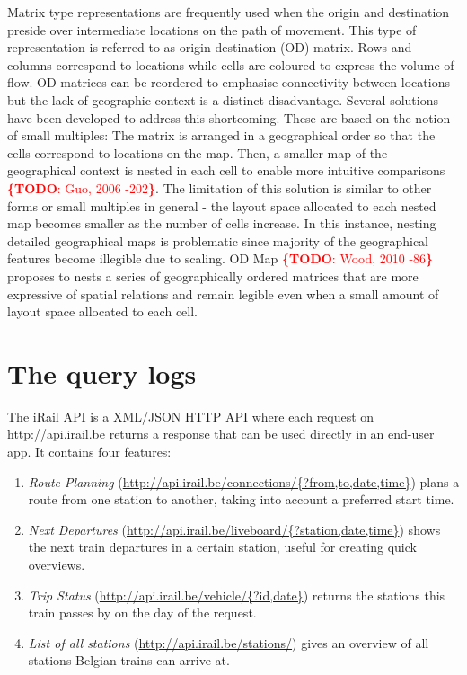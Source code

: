 \documentclass{sig-alternate}
\newcommand{\todo}[1]{\noindent\textcolor{red}{{\bf \{TODO}: #1{\bf \}}}}
\begin{document}
Matrix type representations are frequently used when the origin and destination preside over intermediate locations on the path of movement. This type of representation is referred to as origin-destination (OD) matrix. Rows and columns correspond to locations while cells are coloured to express the volume of flow. OD matrices can be reordered to emphasise connectivity between locations but the lack of geographic context is a distinct disadvantage. Several solutions have been developed to address this shortcoming. These are based on the notion of small multiples: The matrix is arranged in a geographical order so that the cells correspond to locations on the map. Then, a smaller map of the geographical context is nested in each cell to enable more intuitive comparisons \todo{Guo, 2006 -202}. The limitation of this solution is similar to other forms or small multiples in general - the layout space allocated to each nested map becomes smaller as the number of cells increase. In this instance, nesting detailed geographical maps is problematic since majority of the geographical features become illegible due to scaling. OD Map \todo{Wood, 2010 -86} proposes to nests a series of geographically ordered matrices that are more expressive of spatial relations and remain legible even when a small amount of layout space allocated to each cell.

\section{The query logs}
\label{sec:logs}

The iRail API is a XML/JSON HTTP API where each request on \url{http://api.irail.be} returns a response that can be used directly in an end-user app. It contains four features: 
\begin{enumerate}
\item \emph{Route Planning} (\url{http://api.irail.be/connections/{?from,to,date,time}}) plans a route from one station to another, taking into account a preferred start time.
\item \emph{Next Departures} (\url{http://api.irail.be/liveboard/{?station,date,time}}) shows the next train departures in a certain station, useful for creating quick overviews.
\item \emph{Trip Status} (\url{http://api.irail.be/vehicle/{?id,date}}) returns the stations this train passes by on the day of the request.
\item \emph{List of all stations} (\url{http://api.irail.be/stations/}) gives an overview of all stations Belgian trains can arrive at.
\end{enumerate}
\end{document}
